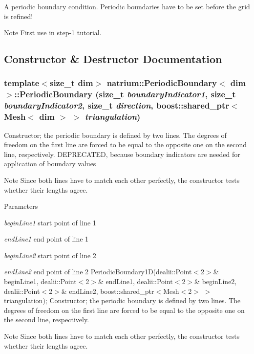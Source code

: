 A periodic boundary condition. Periodic boundaries have to be set before the grid is refined! \begin{DoxyNote}{Note}
First use in step-\/1 tutorial. 
\end{DoxyNote}


\subsection{Constructor \& Destructor Documentation}
\hypertarget{classnatrium_1_1PeriodicBoundary_ad105994a331755f654822813875771d8}{
\subsubsection[{PeriodicBoundary}]{\setlength{\rightskip}{0pt plus 5cm}template$<$size\_\-t dim$>$ {\bf natrium::PeriodicBoundary}$<$ dim $>$::{\bf PeriodicBoundary} (size\_\-t {\em boundaryIndicator1}, \/  size\_\-t {\em boundaryIndicator2}, \/  size\_\-t {\em direction}, \/  boost::shared\_\-ptr$<$ Mesh$<$ dim $>$ $>$ {\em triangulation})}}
\label{classnatrium_1_1PeriodicBoundary_ad105994a331755f654822813875771d8}


Constructor; the periodic boundary is defined by two lines. The degrees of freedom on the first line are forced to be equal to the opposite one on the second line, respectively. DEPRECATED, because boundary indicators are needed for application of boundary values \begin{DoxyNote}{Note}
Since both lines have to match each other perfectly, the constructor tests whether their lengths agree.
\end{DoxyNote}

\begin{DoxyParams}{Parameters}
\item[{\em beginLine1}]start point of line 1 \item[{\em endLine1}]end point of line 1 \item[{\em beginLine2}]start point of line 2 \item[{\em endLine2}]end point of line 2 PeriodicBoundary1D(dealii::Point$<$2$>$\& beginLine1, dealii::Point$<$2$>$\& endLine1, dealii::Point$<$2$>$\& beginLine2, dealii::Point$<$2$>$\& endLine2, boost::shared\_\-ptr$<$Mesh$<$2$>$ $>$ triangulation); Constructor; the periodic boundary is defined by two lines. The degrees of freedom on the first line are forced to be equal to the opposite one on the second line, respectively. \end{DoxyParams}
\begin{DoxyNote}{Note}
Since both lines have to match each other perfectly, the constructor tests whether their lengths agree.
\end{DoxyNote}

